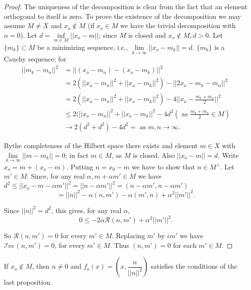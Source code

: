 \begin{proof}
 The uniqueness of the decomposition is clear from the fact that an
 element orthogonal to itself is zero. To prove the existence of the
 decomposition we may assume $M \neq X$ and $x_o \notin M$ (if $x_o
 \in M$ we have the trivial decomposition with $n =0$). Let
 $d = \inf\limits_{m \in M} || x_o - m||$; since $M$ is
 closed and $x_o \notin M,d > 0 $. Let $\{m_k\} \subset M$ be a
 minimizing sequence, i.e., $\lim\limits_{k \to \infty} || x_o -m_k
 || = d$. $\{m_k\} $ is a Cauchy sequence; for   
 \begin{align*}
  || m_k - m_n ||^2 & = || (x_o - m_n) - (x_o - m_k) ||^2 \\
  & = 2 (|| x_o - m_n||^2 +|| x_o - m_k||^2) - ||2 x_o - m_k - m_n||
 ^2 \tag{(Euclidean property )} \\ 
  & = 2 (|| x_o - m_n ||^2 + ||x_o- m_k||^2) - 4 || x_o -
  \frac{m_k + m_n}{2}||^2\\ 
  &\leq 2 (|| x_o - m_n ||^2 + ||x_o- m_k||^2 - 4d^2 (\text{ as
  }\frac{m_k + m_n}{2} \in M)\\ 
  & \to 2 (d^2 + d^2 ) - 4d^2 = \text{ as } m, n \to \infty. 
 \end{align*}

 By\pageoriginale the completeness of the Hilbert space there exists and element $m
 \in X$ with $\lim\limits_ { k \to \infty}|| m - m_k|| = 0 $;
 in fact $m \in M$, as $M$ is closed. Also $||x_o - m || = d$. Write
 $x_o = m + (x_o - m)$. Putting $n = x_0 - m$ we have to show that $
 n \in M^\perp$. Let $m'\in M$. Since, for any real $\alpha, m +
 \alpha m' \in M$ we have $d^2 \leq || x_o - m - \alpha
 m'||^2 = || n - \alpha m'||^2 = (n - \alpha m ', n - \alpha m ' )$ 
 $$
 = ||n ||^2 - \alpha (n, m') - \alpha (m', n ) + \alpha^2 ||m'||^2. 
 $$ 
 
 Since $||n||^2 = d^2 $, this gives, for any real $\alpha$, 
 $$
 0 \leq -2 \alpha \mathscr{R}(n, m')+ \alpha^2 ||m'||^2. 
 $$
 
 So $\mathscr{R} (n, m') = 0 $ for every $m ' \in
 M$. Replacing $m'$ by $im'$ we have $\mathscr{I} m\, (n, m') = 0$, for
 every $m ' \in M$. Thus $(n, m') = 0$ for each $m '
 \in M$. 
\end{proof}

\begin{remark*}
 If $x_o \notin M$, then $n \neq 0$ and $f_o (x) = (x,
 \dfrac{n}{||n||^2})$ satisfies the conditions of the last
 proposition. 
\end{remark*}

